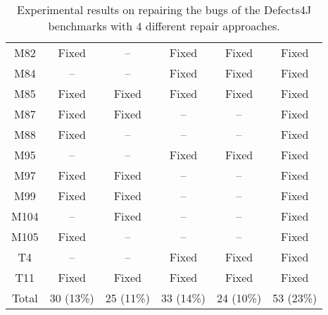 \begin{table}[!t]
{\begin{tabular}{|c|c|c|c|c|c|}
M82               & Fixed     & --        & Fixed     & Fixed     &Fixed   \\
M84               & --        & --        & Fixed     & Fixed     &Fixed   \\
M85               & Fixed     & Fixed     & Fixed     & Fixed     &Fixed   \\
M87               & Fixed     & Fixed     & --        & --        &Fixed   \\
M88               & Fixed     & --        & --        & --        &Fixed   \\
M95               & --        & --        & Fixed     & Fixed     &Fixed   \\
M97               & Fixed     & Fixed     & --        & --        &Fixed   \\
M99               & Fixed     & Fixed     & --        & --        &Fixed   \\
M104              & --        & Fixed     & --        & --        &Fixed   \\
M105              & Fixed     & --        & --        & --        &Fixed   \\
\hline
T4                & --        & --        & Fixed     & Fixed     &Fixed   \\
T11               & Fixed     & Fixed     & Fixed     & Fixed     &Fixed   \\
\hline
Total             & 30 (13\%) & 25 (11\%) & 33 (14\%) & 24 (10\%) & 53 (23\%)\\
\hline 
\end{tabular}%
}
\caption{Experimental results on repairing the bugs of the Defects4J benchmarks with 4 different repair approaches.}
\end{table}
